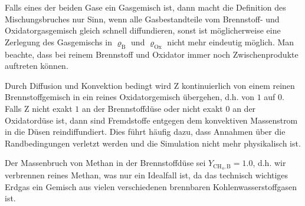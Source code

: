 Falls eines der beiden Gase ein Gasgemisch ist, dann macht die Definition des Mischungsbruches nur Sinn, wenn alle Gasbestandteile vom Brennstoff- und Oxidatorgasgemisch gleich schnell diffundieren, sonst ist möglicherweise eine Zerlegung des Gasgemischs in $\varrho_\text{B}$ und $\varrho_\text{Ox}$ nicht mehr eindeutig möglich. Man beachte, dass bei reinem Brennstoff und Oxidator immer noch Zwischenprodukte auftreten können.

Durch Diffusion und Konvektion bedingt wird \gls{Z} kontinuierlich von einem reinen Brennstoffgemisch in ein reines Oxidatorgemisch übergehen, d.h. von $1$ auf $0$. Falls \gls{Z} nicht exakt $1$ an der Brennstoffdüse oder nicht exakt $0$ an der Oxidatordüse ist, dann sind Fremdstoffe entgegen dem konvektiven Massenstrom in die Düsen reindiffundiert. Dies führt häufig dazu, dass Annahmen über die Randbedingungen verletzt werden und die Simulation nicht mehr physikalisch ist.

Der Massenbruch von Methan in der Brennstoffdüse sei $Y_{\mathrm{CH}_4,\text{B}}=1.0$, d.h. wir verbrennen reines Methan, was nur ein Idealfall ist, da das technisch wichtiges Erdgas ein Gemisch aus vielen verschiedenen brennbaren Kohlenwasserstoffgasen ist.

